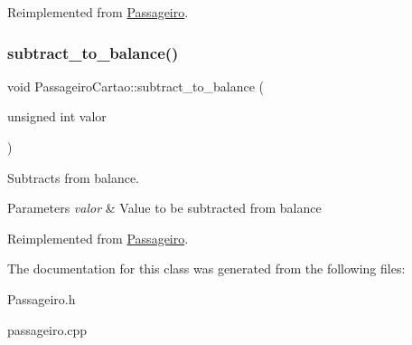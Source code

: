 Reimplemented from \hyperlink{class_passageiro_ad2477f9716b82c3ffbcdfca5bb776679}{Passageiro}.

\mbox{\label{class_passageiro_cartao_ae6d6b0b1b1089b4904a0753c5446baa9}} 
\subsubsection{\texorpdfstring{subtract\+\_\+to\+\_\+balance()}{subtract\_to\_balance()}}
{\footnotesize\ttfamily void Passageiro\+Cartao\+::subtract\+\_\+to\+\_\+balance (\begin{DoxyParamCaption}\item[{unsigned int}]{valor }\end{DoxyParamCaption})\hspace{0.3cm}{\ttfamily [virtual]}}



Subtracts from balance. 


\begin{DoxyParams}{Parameters}
{\em valor} & Value to be subtracted from balance \\
\hline
\end{DoxyParams}


Reimplemented from \hyperlink{class_passageiro_a922b6669669a6e2af2328606013a3a6b}{Passageiro}.



The documentation for this class was generated from the following files\+:\begin{DoxyCompactItemize}
\item 
Passageiro.\+h\item 
passageiro.\+cpp\end{DoxyCompactItemize}
